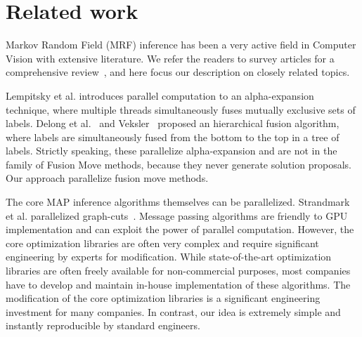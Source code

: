 \section{Related work}


Markov Random Field (MRF) inference has been a very active field in
Computer Vision with extensive literature. We refer the readers to
survey articles for a comprehensive
review~\cite{middlebury_mrf,comparative_study_of_modern_inference}, and
here focus our description on closely related topics.


\noindent Lempitsky et al. introduces parallel computation to an
alpha-expansion technique, where multiple threads simultaneously fuses
mutually exclusive sets of labels. Delong et al.~\cite{delong} and
Veksler~\cite{olga} proposed an hierarchical fusion algorithm, where
labels are simultaneously fused from the bottom to the top in a tree of
labels. Strictly speaking, these parallelize alpha-expansion and are not
in the family of Fusion Move methods, because they never generate
solution proposals. Our approach parallelize fusion move methods.



\noindent
The core MAP inference algorithms themselves can be parallelized.
Strandmark et al. parallelized graph-cuts~\cite{strandmark2010parallel}.
%
Message passing algorithms are friendly to GPU implementation and can
exploit the power of parallel computation.
%
However, the core optimization libraries are often very complex and
require significant engineering by experts for modification.
%
While state-of-the-art optimization libraries are often freely available
for non-commercial purposes, most companies have to develop and maintain
in-house implementation of these algorithms. The modification of the
core optimization libraries is a significant engineering investment for
many companies. In contrast, our idea is extremely simple and instantly
reproducible by standard engineers.





